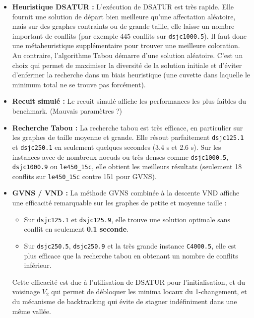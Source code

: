 \documentclass{article}
\begin{document}
\begin{itemize}
    \item \textbf{Heuristique DSATUR :}
    L'exécution de DSATUR est très rapide. Elle fournit une solution de départ bien meilleure qu'une affectation aléatoire, mais sur des graphes contraints ou de grande taille, elle laisse un nombre important de conflits (par exemple 445 conflits sur \texttt{dsjc1000.5}). Il faut donc une métaheuristique supplémentaire pour trouver une meilleure coloration. 
    Au contraire, l'algorithme Tabou démarre d'une solution aléatoire. C'est un choix qui permet de maximiser la diversité de la solution initiale et d'éviter d'enfermer la recherche dans un biais heuristique (une cuvette dans laquelle le minimum total ne se trouve pas forcément).

    \item \textbf{Recuit simulé :}
    Le recuit simulé affiche les performances les plus faibles du benchmark. (Mauvais paramètres ?)
    \item \textbf{Recherche Tabou :}
    La recherche tabou est très efficace, en particulier sur les graphes de taille moyenne et grande. Elle résout parfaitement \texttt{dsjc125.1} et \texttt{dsjc250.1} en seulement quelques secondes (3.4 s et 2.6 s). 
    Sur les instances avec de nombreux noeuds ou très denses comme \texttt{dsjc1000.5}, \texttt{dsjc1000.9} ou \texttt{le450\_15c}, elle obtient les meilleurs résultats (seulement 18 conflits sur \texttt{le450\_15c} contre 151 pour GVNS).
    
    \item \textbf{GVNS / VND :}
    La méthode GVNS combinée à la descente VND affiche une efficacité remarquable sur les graphes de petite et moyenne taille :
    \begin{itemize}
        \item Sur \texttt{dsjc125.1} et \texttt{dsjc125.9}, elle trouve une solution optimale sans conflit en seulement \textbf{0.1 seconde}.
        \item Sur \texttt{dsjc250.5}, \texttt{dsjc250.9} et la très grande instance \texttt{C4000.5}, elle est plus efficace que la recherche tabou en obtenant un nombre de conflits inférieur.
    \end{itemize}
    Cette efficacité est due à l'utilisation de DSATUR pour l'initialisation, et du voisinage $V_2$ qui permet de débloquer les minima locaux du 1-changement, et du mécanisme de backtracking qui évite de stagner indéfiniment dans une même vallée.\\
\end{itemize}
\end{document}
